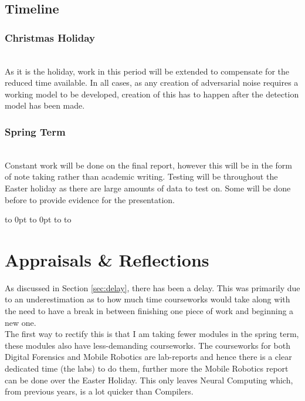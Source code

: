 \documentclass{article}
\begin{document}
\newpage
\thispagestyle{empty}
\def\fillandplacepagenumber{
 \par\pagestyle{empty}
 \vbox to 0pt{\vss}\vfill
 \vbox to 0pt{\baselineskip0pt
   \hbox to\linewidth{\hss}
   \baselineskip\footskip
   \hbox to\linewidth{
     \hfil\thepage\hfil}\vss}}
\begin{landscape}
\subsection{Timeline} \label{sec:timeline}
\subsubsection{Christmas Holiday}
\\
\noindent As it is the holiday, work in this period will be extended to compensate for the reduced time available. In all cases, as any creation of adversarial noise requires a working model to be developed, creation of this has to happen after the detection model has been made.
\subsubsection{Spring Term}
\resizebox{1.5\textwidth}{!}{}\\
Constant work will be done on the final report, however this will be in the form of note taking rather than academic writing. Testing will be throughout the Easter holiday as there are large amounts of data to test on. Some will be done before to provide evidence for the presentation.
\fillandplacepagenumber
\end{landscape}

\section{Appraisals \& Reflections}

As discussed in Section \ref{sec:delay}, there has been a delay. This was primarily due to an underestimation as to how much time courseworks would take along with the need to have a break in between finishing one piece of work and beginning a new one.\\

The first way to rectify this is that I am taking fewer modules in the spring term, these modules also have less-demanding courseworks. The courseworks for both Digital Forensics and Mobile Robotics are lab-reports and hence there is a clear dedicated time (the labs) to do them, further more the Mobile Robotics report can be done over the Easter Holiday. This only leaves Neural Computing which, from previous years, is a lot quicker than Compilers.\\
\end{document}
